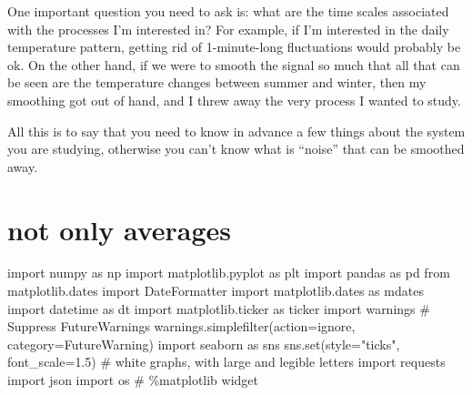 \documentclass[
  letterpaper,
  DIV=11,
  numbers=noendperiod,
  oneside]{scrreprt}
\newenvironment{Shaded}{\begin{snugshade}}{\end{snugshade}}
\newcommand{\BuiltInTok}[1]{\textcolor[rgb]{0.00,0.23,0.31}{#1}}
\newcommand{\CommentTok}[1]{\textcolor[rgb]{0.37,0.37,0.37}{#1}}
\newcommand{\FloatTok}[1]{\textcolor[rgb]{0.68,0.00,0.00}{#1}}
\newcommand{\ImportTok}[1]{\textcolor[rgb]{0.00,0.46,0.62}{#1}}
\newcommand{\NormalTok}[1]{\textcolor[rgb]{0.00,0.23,0.31}{#1}}
\newcommand{\OperatorTok}[1]{\textcolor[rgb]{0.37,0.37,0.37}{#1}}
\newcommand{\PreprocessorTok}[1]{\textcolor[rgb]{0.68,0.00,0.00}{#1}}
\newcommand{\StringTok}[1]{\textcolor[rgb]{0.13,0.47,0.30}{#1}}
\begin{document}
One important question you need to ask is: what are the time scales
associated with the processes I'm interested in? For example, if I'm
interested in the daily temperature pattern, getting rid of
1-minute-long fluctuations would probably be ok. On the other hand, if
we were to smooth the signal so much that all that can be seen are the
temperature changes between summer and winter, then my smoothing got out
of hand, and I threw away the very process I wanted to study.

All this is to say that you need to know in advance a few things about
the system you are studying, otherwise you can't know what is ``noise''
that can be smoothed away.

\hypertarget{not-only-averages}{%
\chapter{not only averages}\label{not-only-averages}}

\begin{Shaded}
\begin{Highlighting}[]
\ImportTok{import}\NormalTok{ numpy }\ImportTok{as}\NormalTok{ np}
\ImportTok{import}\NormalTok{ matplotlib.pyplot }\ImportTok{as}\NormalTok{ plt}
\ImportTok{import}\NormalTok{ pandas }\ImportTok{as}\NormalTok{ pd}
\ImportTok{from}\NormalTok{ matplotlib.dates }\ImportTok{import}\NormalTok{ DateFormatter}
\ImportTok{import}\NormalTok{ matplotlib.dates }\ImportTok{as}\NormalTok{ mdates}
\ImportTok{import}\NormalTok{ datetime }\ImportTok{as}\NormalTok{ dt}
\ImportTok{import}\NormalTok{ matplotlib.ticker }\ImportTok{as}\NormalTok{ ticker}
\ImportTok{import}\NormalTok{ warnings}
\CommentTok{\# Suppress FutureWarnings}
\NormalTok{warnings.simplefilter(action}\OperatorTok{=}\StringTok{\textquotesingle{}ignore\textquotesingle{}}\NormalTok{, category}\OperatorTok{=}\PreprocessorTok{FutureWarning}\NormalTok{)}
\ImportTok{import}\NormalTok{ seaborn }\ImportTok{as}\NormalTok{ sns}
\NormalTok{sns.}\BuiltInTok{set}\NormalTok{(style}\OperatorTok{=}\StringTok{"ticks"}\NormalTok{, font\_scale}\OperatorTok{=}\FloatTok{1.5}\NormalTok{)  }\CommentTok{\# white graphs, with large and legible letters}
\ImportTok{import}\NormalTok{ requests}
\ImportTok{import}\NormalTok{ json}
\ImportTok{import}\NormalTok{ os}
\CommentTok{\# \%matplotlib widget}
\end{Highlighting}
\end{Shaded}
\end{document}
